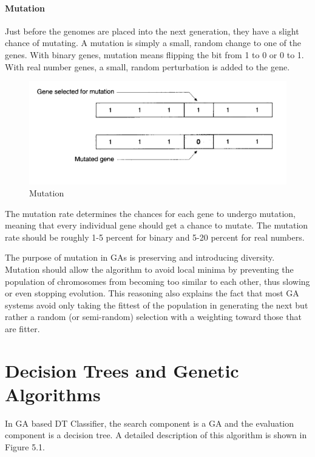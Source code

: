 \documentclass[12pt]{report}
\begin{document}
\subsubsection{Mutation}
Just before the genomes are placed into the next generation, they have a slight chance of mutating. A mutation is simply a small, random change to one of the genes. With binary genes, mutation means flipping the bit from 1 to 0 or 0 to 1. With real number genes, a small, random perturbation is added to the gene. 

\begin{figure}[h!]
	\centering
		\includegraphics[scale=1.0]{mutation.png}
	\caption{Mutation}
	\label{fig:mutation}
\end{figure}

The mutation rate determines the chances for each gene to undergo mutation, meaning that every individual gene should get a chance to mutate. The mutation rate should be roughly 1-5 percent for binary and 5-20 percent for real numbers. 

The purpose of mutation in GAs is preserving and introducing diversity. Mutation should allow the algorithm to avoid local minima by preventing the population of chromosomes from becoming too similar to each other, thus slowing or even stopping evolution. This reasoning also explains the fact that most GA systems avoid only taking the fittest of the population in generating the next but rather a random (or semi-random) selection with a weighting toward those that are fitter.




\pagestyle{fancy}
\chead{}
\rfoot{\small{\thepage}}
\renewcommand{\headrulewidth}{0.4pt}
\renewcommand{\footrulewidth}{0.4pt}
\chapter{Decision Trees and Genetic Algorithms}
In GA based DT Classifier, the search component is a GA and the
evaluation component is a decision tree. A detailed description of
this algorithm is shown in Figure 5.1.
\end{document}
